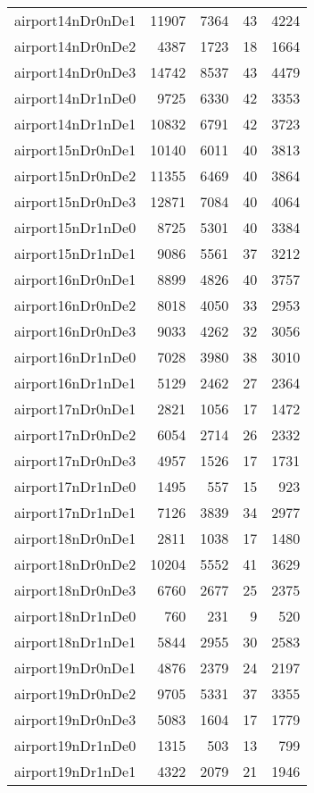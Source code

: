 \begin{longtable}{lrrrr}
airport14nDr0nDe1 & 11907 & 7364 & 43 & 4224 \\
airport14nDr0nDe2 & 4387 & 1723 & 18 & 1664 \\
airport14nDr0nDe3 & 14742 & 8537 & 43 & 4479 \\
airport14nDr1nDe0 & 9725 & 6330 & 42 & 3353 \\
airport14nDr1nDe1 & 10832 & 6791 & 42 & 3723 \\
airport15nDr0nDe1 & 10140 & 6011 & 40 & 3813 \\
airport15nDr0nDe2 & 11355 & 6469 & 40 & 3864 \\
airport15nDr0nDe3 & 12871 & 7084 & 40 & 4064 \\
airport15nDr1nDe0 & 8725 & 5301 & 40 & 3384 \\
airport15nDr1nDe1 & 9086 & 5561 & 37 & 3212 \\
airport16nDr0nDe1 & 8899 & 4826 & 40 & 3757 \\
airport16nDr0nDe2 & 8018 & 4050 & 33 & 2953 \\
airport16nDr0nDe3 & 9033 & 4262 & 32 & 3056 \\
airport16nDr1nDe0 & 7028 & 3980 & 38 & 3010 \\
airport16nDr1nDe1 & 5129 & 2462 & 27 & 2364 \\
airport17nDr0nDe1 & 2821 & 1056 & 17 & 1472 \\
airport17nDr0nDe2 & 6054 & 2714 & 26 & 2332 \\
airport17nDr0nDe3 & 4957 & 1526 & 17 & 1731 \\
airport17nDr1nDe0 & 1495 & 557 & 15 & 923 \\
airport17nDr1nDe1 & 7126 & 3839 & 34 & 2977 \\
airport18nDr0nDe1 & 2811 & 1038 & 17 & 1480 \\
airport18nDr0nDe2 & 10204 & 5552 & 41 & 3629 \\
airport18nDr0nDe3 & 6760 & 2677 & 25 & 2375 \\
airport18nDr1nDe0 & 760 & 231 & 9 & 520 \\
airport18nDr1nDe1 & 5844 & 2955 & 30 & 2583 \\
airport19nDr0nDe1 & 4876 & 2379 & 24 & 2197 \\
airport19nDr0nDe2 & 9705 & 5331 & 37 & 3355 \\
airport19nDr0nDe3 & 5083 & 1604 & 17 & 1779 \\
airport19nDr1nDe0 & 1315 & 503 & 13 & 799 \\
airport19nDr1nDe1 & 4322 & 2079 & 21 & 1946 \\

\end{longtable}
